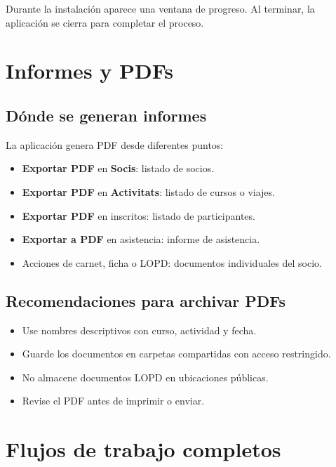 \documentclass[12pt]{article}
\newcommand{\boton}[1]{\textbf{#1}}
\newcommand{\menu}[1]{\textbf{#1}}
\begin{document}
Durante la instalación aparece una ventana de progreso. Al terminar, la aplicación se cierra para completar el proceso.

\section{Informes y PDFs}
\subsection{Dónde se generan informes}
La aplicación genera PDF desde diferentes puntos:
\begin{itemize}
  \item \boton{Exportar PDF} en \menu{Socis}: listado de socios.
  \item \boton{Exportar PDF} en \menu{Activitats}: listado de cursos o viajes.
  \item \boton{Exportar PDF} en inscritos: listado de participantes.
  \item \boton{Exportar a PDF} en asistencia: informe de asistencia.
  \item Acciones de carnet, ficha o LOPD: documentos individuales del socio.
\end{itemize}

\subsection{Recomendaciones para archivar PDFs}
\begin{itemize}
  \item Use nombres descriptivos con curso, actividad y fecha.
  \item Guarde los documentos en carpetas compartidas con acceso restringido.
  \item No almacene documentos LOPD en ubicaciones públicas.
  \item Revise el PDF antes de imprimir o enviar.
\end{itemize}

\section{Flujos de trabajo completos}
\end{document}
